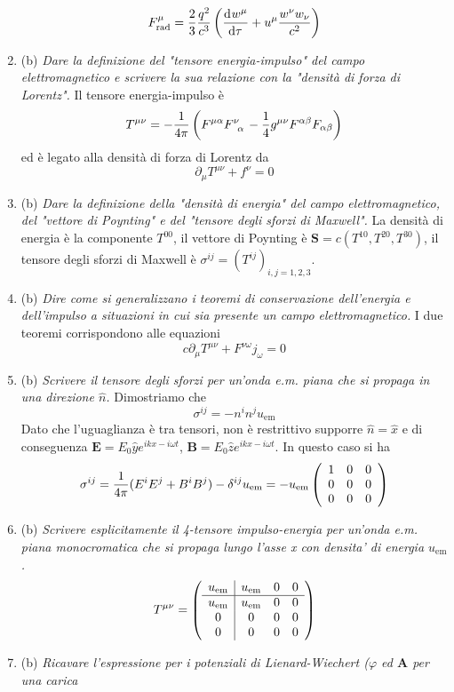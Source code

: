\documentclass{article}
\renewcommand{\b}{(b)}
\renewcommand{\t}[1]{\textit{ #1}}
\renewcommand{\vec}[1]{\mathbf{#1}}
\begin{document}
\begin{enumerate}
	\[F^{\mu}_\textrm{rad}=\frac{2}{3}\frac{q^2}{c^3}\left(\dfrac{\mathrm{d} ^{}w^\mu}{\mathrm{d} {\tau}^{}}+u^\mu\frac{w^\nu w_\nu}{c^2}\right)\]
	\item\b\t{Dare la definizione del "tensore energia-impulso" del campo elettromagnetico e
		scrivere la sua relazione con la "densità di forza di Lorentz".} Il tensore energia-impulso è
	\[T^{\mu\nu}=-\frac{1}{4\pi}\left(F^{\mu\alpha}\tensor{F}{^\nu_\alpha}-\frac{1}{4}g^{\mu\nu}F^{\alpha\beta}F_{\alpha\beta}\right)\]
	ed è legato alla densità di forza di Lorentz da
	\[\partial_\mu T^{\mu\nu}+f^{\nu}=0\]
	\item\b\t{Dare la definizione della "densità di energia" del campo elettromagnetico, del
		"vettore di Poynting" e del "tensore degli sforzi di Maxwell".}
	La densità di energia è la componente $T^{00}$, il vettore di Poynting è $\vec{S}=c(T^{10},T^{20},T^{30})$, il tensore degli sforzi di Maxwell è $\sigma^{ij}=(T^{ij})_{i,j=1,2,3}$.
	\item\b\t{Dire come si generalizzano i teoremi di conservazione dell'energia e dell'impulso
		a situazioni in cui sia presente un campo elettromagnetico.}
	I due teoremi corrispondono alle equazioni
	\[c\partial_\mu T^{\mu\nu}+F^{\nu\omega}j_\omega=0\]
	\item\b\t{Scrivere il tensore degli sforzi per un’onda e.m. piana che si propaga in una
		direzione $\hat{n}$.}
	Dimostriamo che \[\sigma^{ij}=-n^in^ju_\textrm{em}\]
	Dato che l'uguaglianza è tra tensori, non è restrittivo supporre $\hat{n}=\hat{x}$ e di conseguenza $\vec{E}=E_0\hat{y}e^{ikx-i\omega t}$, $\vec{B}=E_0\hat{z}e^{ikx-i\omega t}$. In questo caso si ha
	\[\sigma^{ij}=\frac{1}{4\pi}(E^iE^j+B^iB^j)-\delta^{ij}u_\textrm{em}=-u_\textrm{em}\left(\begin{array}{c c c}1&0&0\\0&0&0\\0&0&0
	\end{array}\right)\]
	\item\b\t{Scrivere esplicitamente il 4-tensore impulso-energia per un’onda e.m. piana
		monocromatica che si propaga lungo l’asse x con densita’ di energia $u_\mathrm{em}$.}
	\[T^{\mu\nu}=\left(\begin{array}{c | c  c c}
	u_\textrm{em}&u_\textrm{em}&0&0\\\hline u_\textrm{em}&u_\textrm{em}&0&0\\0&0&0&0\\0&0&0&0
	\end{array}\right)\]
	\item\b\t{Ricavare l’espressione per i potenziali di Lienard-Wiechert ($\varphi$ ed $\vec{A}$ per una carica
}
\end{enumerate}
\end{document}
